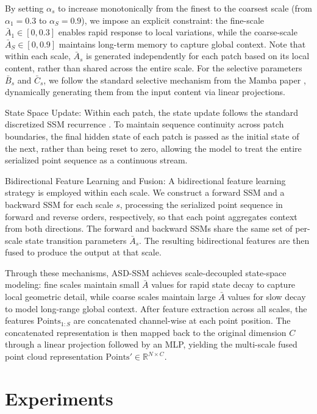 \documentclass[a4paper,fleqn]{cas-sc}
\begin{document}
By setting $\alpha_s$ to increase monotonically from the finest to the coarsest scale (from $\alpha_1 = 0.3$ to $\alpha_S = 0.9$), we impose an explicit constraint: the fine-scale $\bar{A}_1 \in [0, 0.3]$ enables rapid response to local variations, while the coarse-scale $\bar{A}_S \in [0, 0.9]$ maintains long-term memory to capture global context. Note that within each scale, $\bar{A}_s$ is generated independently for each patch based on its local content, rather than shared across the entire scale. For the selective parameters $\bar{B}_s$ and $\bar{C}_s$, we follow the standard selective mechanism from the Mamba paper \cite{Mamba}, dynamically generating them from the input content via linear projections.

State Space Update: Within each patch, the state update follows the standard discretized SSM recurrence \cite{Mamba}. To maintain sequence continuity across patch boundaries, the final hidden state of each patch is passed as the initial state of the next, rather than being reset to zero, allowing the model to treat the entire serialized point sequence as a continuous stream.

Bidirectional Feature Learning and Fusion: A bidirectional feature learning strategy is employed within each scale. We construct a forward SSM and a backward SSM for each scale $s$, processing the serialized point sequence in forward and reverse orders, respectively, so that each point aggregates context from both directions. The forward and backward SSMs share the same set of per-scale state transition parameters $\bar{A}_s$. The resulting bidirectional features are then fused to produce the output at that scale.

Through these mechanisms, ASD-SSM achieves scale-decoupled state-space modeling: fine scales maintain small $\bar{A}$ values for rapid state decay to capture local geometric detail, while coarse scales maintain large $\bar{A}$ values for slow decay to model long-range global context. After feature extraction across all scales, the features $\text{Points}_{1:S}$ are concatenated channel-wise at each point position. The concatenated representation is then mapped back to the original dimension $C$ through a linear projection followed by an MLP, yielding the multi-scale fused point cloud representation $\text{Points}' \in \mathbb{R}^{N \times C}$.

\section{Experiments}\label{sec:experiment}
\end{document}
